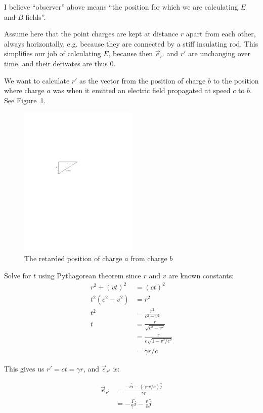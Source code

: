 \documentclass[a4paper]{article}
\theoremstyle{plain}
\theoremstyle{definition}
\newcommand{\vect}[1]{\vec{#1}}
\newcommand{\hatvec}[1]{\hat{#1}}
\newcommand{\ihat}{\hatvec{i}}
\newcommand{\jhat}{\hatvec{j}}
\begin{document}
I believe ``observer'' above means ``the position for which we are
calculating $E$ and $B$ fields''.

Assume here that the point charges are kept at distance $r$ apart from
each other, always horizontally, e.g. because they are connected by a
stiff insulating rod.  This simplifies our job of calculating $E$,
because then $\vect{e}_{r'}$ and $r'$ are unchanging over time, and
their derivates are thus 0.

We want to calculate $r'$ as the vector from the position of charge
$b$ to the position where charge $a$ was when it emitted an electric
field propagated at speed $c$ to $b$.  See
Figure~\ref{fig:retarded-position}.

\begin{figure}[ht]
	\centering
	\includegraphics[width=0.5\textwidth]{retarded-position-cropped.pdf}
	\caption{The retarded position of charge $a$ from charge $b$}
	\label{fig:retarded-position}
\end{figure}

Solve for $t$ using Pythagorean theorem since $r$ and $v$ are known
constants:
\begin{align*}
r^2 + (vt)^2 & = (ct)^2 \\
t^2 (c^2 - v^2) & = r^2 \\
t^2 & = \frac{r^2}{c^2 - v^2} \\
t & = \frac{r}{\sqrt{c^2-v^2}} \\
  & = \frac{r}{c \sqrt{1 - v^2/c^2}} \\
  & = \gamma r / c
\end{align*}

This gives us $r' = ct = \gamma r$, and $\vect{e}_{r'}$ is:

\begin{align*}
\vect{e}_{r'} & = \frac{-r \ihat - (\gamma r v / c) \jhat}{\gamma r} \\
  & = - \frac{1}{\gamma} \ihat - \frac{v}{c} \jhat
\end{align*}
\end{document}
